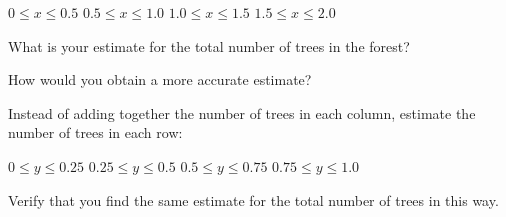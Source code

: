 \begin{pa}
      \medskip \noindent
      $\displaystyle 0 \leq x \leq 0.5$
      \hfill
      $\displaystyle 0.5 \leq x \leq 1.0$
      \hfill
      $\displaystyle 1.0 \leq x \leq 1.5$
      \hfill
      $\displaystyle 1.5 \leq x \leq 2.0$

      \item What is your estimate for the total number of trees in the
        forest? 

      \item How would you obtain a more accurate estimate?

      \item Instead of adding together the number of trees in each
        column, estimate the number of trees in each row:

        \medskip \noindent
        $\displaystyle 0 \leq y \leq 0.25$
        \hfill
        $\displaystyle 0.25 \leq y \leq0.5$
        \hfill
        $\displaystyle 0.5 \leq y \leq 0.75$
        \hfill
        $\displaystyle 0.75 \leq y \leq 1.0$

      \item Verify that you find the same estimate for the total
        number of trees in this way.


      \ea
\end{pa} \afterpa 